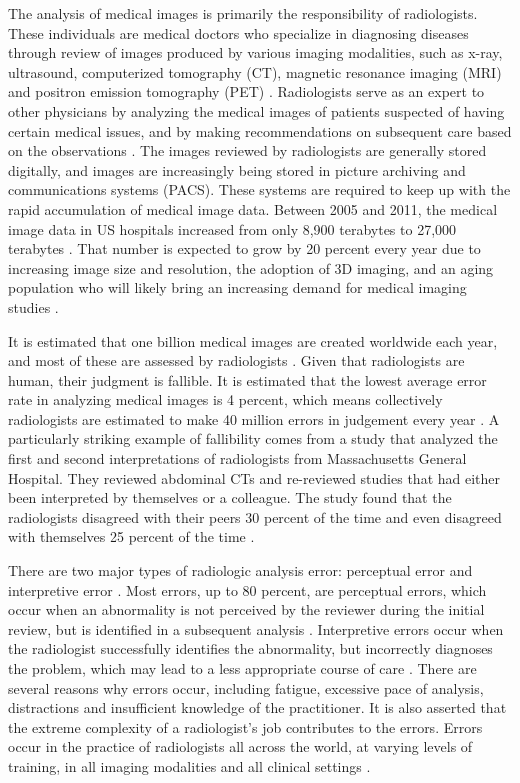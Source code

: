 \documentclass[sigconf]{acmart}
\begin{document}
The analysis of medical images is primarily the responsibility of radiologists. These individuals are medical doctors who specialize in diagnosing diseases through review of images produced by various imaging modalities, such as x-ray, ultrasound, computerized tomography (CT), magnetic resonance imaging (MRI) and positron emission tomography (PET) \cite{cite00}. Radiologists serve as an expert to other physicians by analyzing the medical images of patients suspected of having certain medical issues, and by making recommendations on subsequent care based on the observations \cite{cite00}. The images reviewed by radiologists are generally stored digitally, and images are increasingly being stored in picture archiving and communications systems (PACS). These systems are required to keep up with the rapid accumulation of medical image data. Between 2005 and 2011, the medical image data in US hospitals increased from only 8,900 terabytes to 27,000 terabytes \cite{cite04}. That number is expected to grow by 20 percent every year due to increasing image size and resolution, the adoption of 3D imaging, and an aging population who will likely bring an increasing demand for medical imaging studies \cite{cite04}.

It is estimated that one billion medical images are created worldwide each year, and most of these are assessed by radiologists \cite{cite01}. Given that radiologists are human, their judgment is fallible. It is estimated that the lowest average error rate in analyzing medical images is 4 percent, which means collectively radiologists are estimated to make 40 million errors in judgement every year \cite{cite01}. A particularly striking example of fallibility comes from a study that analyzed the first and second interpretations of radiologists from Massachusetts General Hospital. They reviewed abdominal CTs and re-reviewed studies that had either been interpreted by themselves or a colleague. The study found that the radiologists disagreed with their peers 30 percent of the time and even disagreed with themselves 25 percent of the time \cite{cite01}.

There are two major types of radiologic analysis error: perceptual error and interpretive error \cite{cite01}. Most errors, up to 80 percent, are perceptual errors, which occur when an abnormality is not perceived by the reviewer during the initial review, but is identified in a subsequent analysis \cite{cite01}. Interpretive errors occur when the radiologist successfully identifies the abnormality, but incorrectly diagnoses the problem, which may lead to a less appropriate course of care \cite{cite01}. There are several reasons why errors occur, including fatigue, excessive pace of analysis, distractions and insufficient knowledge of the practitioner. It is also asserted that the extreme complexity of a radiologist's job contributes to the errors. Errors occur in the practice of radiologists all across the world, at varying levels of training, in all imaging modalities and all clinical settings \cite{cite01}.
\end{document}
